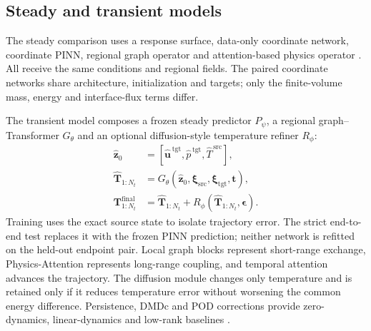 \subsection{Steady and transient models}

The steady comparison uses a response surface, data-only coordinate network,
coordinate PINN, regional graph operator and attention-based physics operator
\cite{raissi2019pinn}. All receive the same conditions and regional fields.
The paired coordinate networks share architecture, initialization and targets;
only the finite-volume mass, energy and interface-flux terms differ.

The transient model composes a frozen steady predictor $P_\psi$, a regional
graph--Transformer $G_\theta$ and an optional diffusion-style temperature
refiner $R_\phi$:
\begin{align}
\widehat{\mathbf z}_0&=
[\widehat{\mathbf u}^{\,\mathrm{tgt}},
\widehat p^{\,\mathrm{tgt}},
\widehat T^{\,\mathrm{src}}],\\
\widehat{\mathbf T}_{1:N_t}
&=G_\theta(\widehat{\mathbf z}_0,
\boldsymbol\xi_{\mathrm{src}},
\boldsymbol\xi_{\mathrm{tgt}},\mathbf t),\\
\mathbf T^{\mathrm{final}}_{1:N_t}
&=\widehat{\mathbf T}_{1:N_t}
+R_\phi(\widehat{\mathbf T}_{1:N_t},\boldsymbol\epsilon).
\end{align}
Training uses the exact \OpenFOAM{} source state to isolate trajectory error.
The strict end-to-end test replaces it with the frozen PINN prediction;
neither network is refitted on the held-out endpoint pair.
Local graph blocks represent short-range exchange, Physics-Attention represents
long-range coupling, and temporal attention advances the trajectory. The
diffusion module changes only temperature and is retained only if it reduces
temperature error without worsening the common energy difference. Persistence,
DMDc and POD corrections provide zero-dynamics, linear-dynamics and low-rank baselines
\cite{vaswani2017attention,proctor2016dmdc,sirovich1987pod,lippe2023pderefiner}.

